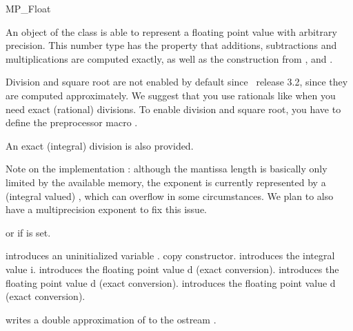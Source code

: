 
\begin{ccRefClass} {MP_Float}

\ccDefinition
An object of the class  is able to represent a floating point
value with arbitrary precision.  This number type has the property that
additions, subtractions and multiplications are computed exactly, as well as
the construction from ,  and .

Division and square root are not enabled by default since \cgal\ release 3.2,
since they are computed approximately.  We suggest that you use
rationals like  when you need exact (rational)
divisions.
To enable division and square root, you have to define the preprocessor
macro .

An exact (integral) division is also provided.

Note on the implementation : although the mantissa length is basically only
limited by the available memory, the exponent is currently represented by a
(integral valued) , which can overflow in some circumstances.  We
plan to also have a multiprecision exponent to fix this issue.


\ccIsModel
{}
or  if  is set.

\ccCreation
{}

{introduces an uninitialized variable \ccVar.}
\ccGlue
{}
{copy constructor.}
\ccGlue
{}
{introduces the integral value i.}
\ccGlue
{}
{introduces the floating point value d (exact conversion).}
\ccGlue
{}
{introduces the floating point value d (exact conversion).}
\ccGlue
{}
{introduces the floating point value d (exact conversion).}

\ccOperations

{writes a double approximation of  to the ostream .}


\end{ccRefClass}
